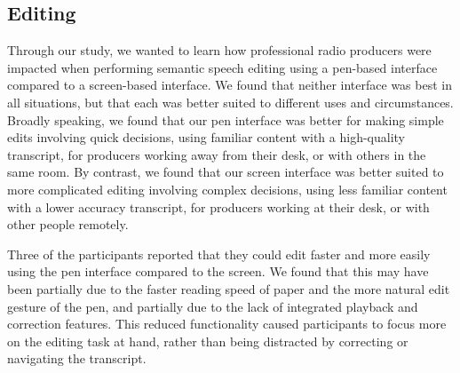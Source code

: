 

\subsection{Editing}


Through our study, we wanted to learn how professional radio producers were impacted when performing semantic speech
editing using a pen-based interface compared to a screen-based interface.  We found that neither interface was best in
all situations, but that each was better suited to different uses and circumstances.  Broadly speaking, we found that
our pen interface was better for making simple edits involving quick decisions, using familiar content with a
high-quality transcript, for producers working away from their desk, or with others in the same room.  By contrast, we
found that our screen interface was better suited to more complicated editing involving complex decisions, using less
familiar content with a lower accuracy transcript, for producers working at their desk, or with other people remotely.

Three of the participants reported that they could edit faster and more easily using the pen interface compared to the
screen.
We found that this may have been partially due to the faster reading speed of paper and the more natural edit gesture
of the pen, and partially due to the lack of integrated playback and correction features.  This reduced functionality
caused participants to focus more on the editing task at hand, rather than being distracted by correcting or navigating
the transcript.

